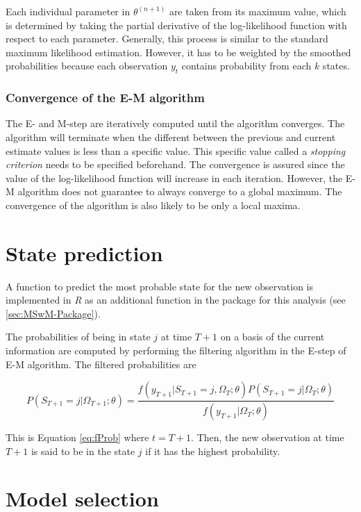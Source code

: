 Each individual parameter in $\theta^{(n+1)}$ are taken from its
maximum value, which is determined by taking the partial derivative
of the log-likelihood function with respect to each parameter. Generally,
this process is similar to the standard maximum likelihood estimation.
However, it has to be weighted by the smoothed probabilities because
each observation $y_{t}$ contains probability from each $k$ states. 

\subsubsection{Convergence of the E-M algorithm}

The E- and M-step are iteratively computed until the algorithm converges.
The algorithm will terminate when the different between the previous
and current estimate values is less than a specific value. This specific
value called a \emph{stopping criterion} needs to be specified beforehand.
The convergence is assured since the value of the log-likelihood function
will increase in each iteration. However, the E-M algorithm does not
guarantee to always converge to a global maximum. The convergence
of the algorithm is also likely to be only a local maxima. 

\section{State prediction}

A function to predict the most probable state for the new observation
is implemented in \emph{R} as an additional function in the package
for this analysis (see \ref{sec:MSwM-Package}).

The probabilities of being in state $j$ at time $T+1$ on a basis
of the current information are computed by performing the filtering
algorithm in the E-step of E-M algorithm. The filtered probabilities
are

\[
P(S_{T+1}=j|\Omega_{T+1};\theta)=\frac{f(y_{T+1}|S_{T+1}=j,\Omega_{T};\theta)P(S_{T+1}=j|\Omega_{T};\theta)}{f(y_{T+1}|\Omega_{T};\theta)}
\]

This is Equation \ref{eq:fProb} where $t=T+1$. Then, the new observation
at time $T+1$ is said to be in the state $j$ if it has the highest
probability.

\section{Model selection}

